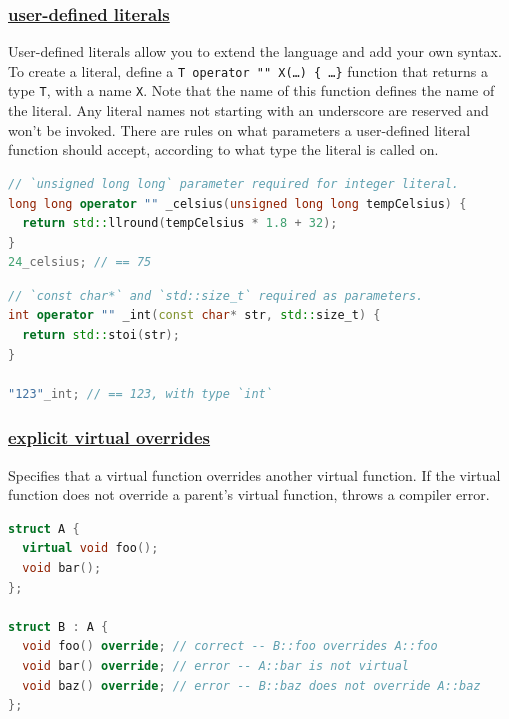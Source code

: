 \subsubsection{\href{https://github.com/AnthonyCalandra/modern-cpp-features/tree/master\#user-defined-literals}
                    {user-defined literals}}
User-defined literals allow you to extend the language and add your own 
syntax. To create a literal, define a \texttt{T operator "" X(\dots) \{ \dots \}} 
function that returns a type \texttt{T}, with a name \texttt{X}. Note that 
the name of this function defines the name of the literal. 
Any literal names not starting with an underscore are reserved and won't 
be invoked. There are rules on what parameters a user-defined literal 
function should accept, according to what type the literal is called on.
\newline
{}
\begin{lstlisting}[language=C++]
// `unsigned long long` parameter required for integer literal.
long long operator "" _celsius(unsigned long long tempCelsius) {
  return std::llround(tempCelsius * 1.8 + 32);
}
24_celsius; // == 75
\end{lstlisting}
\begin{lstlisting}[language=C++]
// `const char*` and `std::size_t` required as parameters.
int operator "" _int(const char* str, std::size_t) {
  return std::stoi(str);
}

"123"_int; // == 123, with type `int`
\end{lstlisting}

\subsubsection{\href{https://github.com/AnthonyCalandra/modern-cpp-features/tree/master\#explicit-virtual-overrides}
                    {explicit virtual overrides}}
Specifies that a virtual function overrides another virtual function. 
If the virtual function does not override a parent's virtual function, 
throws a compiler error.

\begin{lstlisting}[language=C++]
struct A {
  virtual void foo();
  void bar();
};

struct B : A {
  void foo() override; // correct -- B::foo overrides A::foo
  void bar() override; // error -- A::bar is not virtual
  void baz() override; // error -- B::baz does not override A::baz
};
\end{lstlisting}

